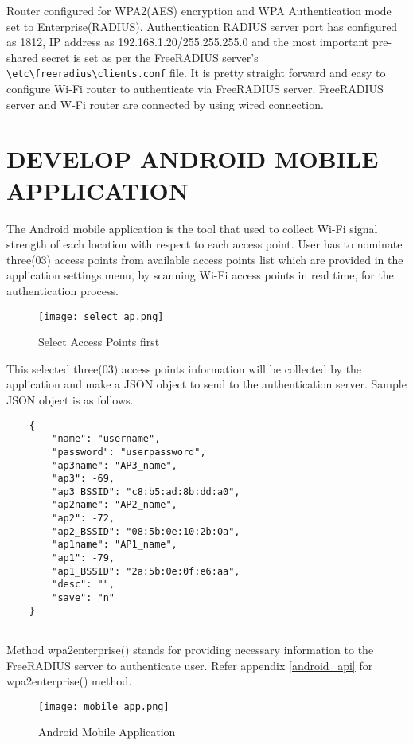 Router configured for WPA2(AES) encryption and WPA Authentication mode set to Enterprise(RADIUS). Authentication RADIUS server port has configured as 1812, IP address as 192.168.1.20/255.255.255.0 and the most important pre-shared secret is set as per the FreeRADIUS server's \verb|\etc\freeradius\clients.conf| file. It is pretty straight forward and easy to configure Wi-Fi router to authenticate via FreeRADIUS server. FreeRADIUS server and W-Fi router are connected by using wired connection.

\section{DEVELOP ANDROID MOBILE APPLICATION}
The Android mobile application is the tool that used to collect Wi-Fi signal strength of each location with respect to each access point. User has to nominate three(03) access  points from available access points list which are provided in the application settings menu, by scanning Wi-Fi access points in real time, for the authentication process.

\begin{center}
	\begin{figure*}[h]	
		\centering
		\texttt{[image: select\_ap.png]}
		\caption{Select Access Points first}
	\end{figure*}
\end{center}

\newpage
This selected three(03) access points information will be collected by the application and make a JSON object to send to the authentication server. Sample JSON object is as follows.\cite{jsonlint}
	\begin{lstlisting}
	{
		"name": "username",
		"password": "userpassword",
		"ap3name": "AP3_name",
		"ap3": -69,
		"ap3_BSSID": "c8:b5:ad:8b:dd:a0",
		"ap2name": "AP2_name",
		"ap2": -72,
		"ap2_BSSID": "08:5b:0e:10:2b:0a",
		"ap1name": "AP1_name",
		"ap1": -79,
		"ap1_BSSID": "2a:5b:0e:0f:e6:aa",
		"desc": "",
		"save": "n"
	}
	
	\end{lstlisting}

\newpage
Method wpa2enterprise() stands for providing necessary information to the FreeRADIUS server to authenticate user. \cite{wifi_connect}
Refer appendix \ref{android_api} for wpa2enterprise() method.

\begin{center}
	\begin{figure*}[h]	
		\centering
		\texttt{[image: mobile\_app.png]}
		\caption{Android Mobile Application}
	\end{figure*}
\end{center}

